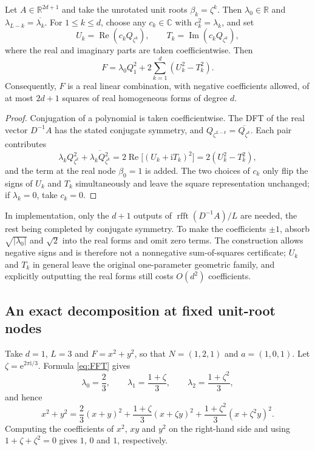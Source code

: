 \documentclass[10pt,twoside,final]{siamart1116}
\numberwithin{equation}{section}
\numberwithin{theorem}{section}
\newcommand{\C}{\mathbb C}
\newcommand{\R}{\mathbb R}
\newcommand{\e}{\mathrm e}
\newcommand{\ii}{\mathrm i}
\begin{document}
\begin{proposition}\label{prop:real}
Let $A\in\R^{2d+1}$ and take the unrotated unit roots $\beta_k=\zeta^k$. Then
$\lambda_0\in\R$ and $\lambda_{L-k}=\overline{\lambda_k}$. For $1\le k\le d$, choose any
$c_k\in\C$ with $c_k^2=\lambda_k$, and set
\[
U_k=\operatorname{Re}(c_kQ_{\zeta^k}),\qquad
T_k=\operatorname{Im}(c_kQ_{\zeta^k}),
\]
where the real and imaginary parts are taken coefficientwise. Then
\begin{equation}\label{eq:real-squares}
F=\lambda_0 Q_1^2+2\sum_{k=1}^{d}(U_k^2-T_k^2).
\end{equation}
Consequently, $F$ is a real linear combination, with negative coefficients allowed, of
at most $2d+1$ squares of real homogeneous forms of degree $d$.
\end{proposition}
\begin{proof}
Conjugation of a polynomial is taken coefficientwise. The DFT of the real vector
$D^{-1}A$ has the stated conjugate symmetry, and
$Q_{\zeta^{L-k}}=\overline{Q_{\zeta^k}}$. Each pair contributes
\[
\lambda_k Q_{\zeta^k}^2+\overline{\lambda_k Q_{\zeta^k}^2}
=2\operatorname{Re}\bigl[(U_k+\ii T_k)^2\bigr]=2(U_k^2-T_k^2),
\]
and the term at the real node $\beta_0=1$ is added. The two choices of $c_k$ only flip
the signs of $U_k$ and $T_k$ simultaneously and leave the square representation
unchanged; if $\lambda_k=0$, take $c_k=0$.
\end{proof}

In implementation, only the $d+1$ outputs of $\operatorname{rfft}(D^{-1}A)/L$ are
needed, the rest being completed by conjugate symmetry. To make the coefficients
$\pm1$, absorb $\sqrt{|\lambda_0|}$ and $\sqrt2$ into the real forms and omit zero
terms. The construction allows negative signs and is therefore not a nonnegative
sum-of-squares certificate; $U_k$ and $T_k$ in general leave the original one-parameter
geometric family, and explicitly outputting the real forms still costs $O(d^2)$
coefficients.

\subsection{An exact decomposition at fixed unit-root nodes}

Take $d=1$, $L=3$ and $F=x^2+y^2$, so that $N=(1,2,1)$ and $a=(1,0,1)$. Let
$\zeta=\e^{2\pi\ii/3}$. Formula \eqref{eq:FFT} gives
\[
\lambda_0=\frac23,\qquad
\lambda_1=\frac{1+\zeta}{3},\qquad
\lambda_2=\frac{1+\zeta^2}{3},
\]
and hence
\begin{equation}\label{eq:small}
x^2+y^2=\frac23(x+y)^2+
\frac{1+\zeta}{3}(x+\zeta y)^2+
\frac{1+\zeta^2}{3}(x+\zeta^2y)^2.
\end{equation}
Computing the coefficients of $x^2$, $xy$ and $y^2$ on the right-hand side and using
$1+\zeta+\zeta^2=0$ gives $1$, $0$ and $1$, respectively.
\end{document}

